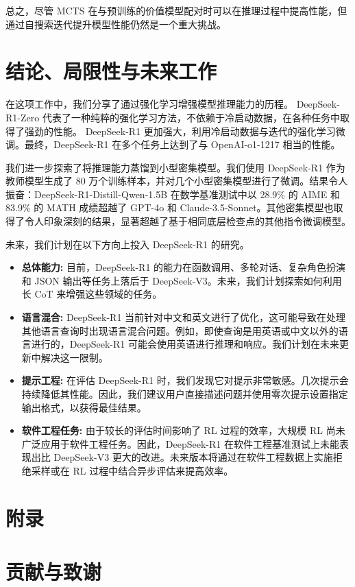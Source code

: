 \documentclass[11pt, a4paper, logo, copyright, nonumbering]{deepseek}
\newcommand{\dsri}{DeepSeek-R1}
\newcommand{\dsro}{DeepSeek-R1-Zero}
\begin{document}
总之，尽管 MCTS 在与预训练的价值模型配对时可以在推理过程中提高性能，但通过自搜索迭代提升模型性能仍然是一个重大挑战。
\section{结论、局限性与未来工作}

在这项工作中，我们分享了通过强化学习增强模型推理能力的历程。 \dsro{} 代表了一种纯粹的强化学习方法，不依赖于冷启动数据，在各种任务中取得了强劲的性能。 \dsri{} 更加强大，利用冷启动数据与迭代的强化学习微调。最终，\dsri{} 在多个任务上达到了与 OpenAI-o1-1217 相当的性能。

我们进一步探索了将推理能力蒸馏到小型密集模型。我们使用 \dsri{} 作为教师模型生成了 80 万个训练样本，并对几个小型密集模型进行了微调。结果令人振奋：DeepSeek-R1-Distill-Qwen-1.5B 在数学基准测试中以 28.9\% 的 AIME 和 83.9\% 的 MATH 成绩超越了 GPT-4o 和 Claude-3.5-Sonnet。其他密集模型也取得了令人印象深刻的结果，显著超越了基于相同底层检查点的其他指令微调模型。

未来，我们计划在以下方向上投入 \dsri{} 的研究。
\begin{itemize}[topsep=0pt]
    \item \textbf{总体能力:}
  目前，\dsri{} 的能力在函数调用、多轮对话、复杂角色扮演和 JSON 输出等任务上落后于 DeepSeek-V3。未来，我们计划探索如何利用长 CoT 来增强这些领域的任务。
    \item \textbf{语言混合:}
\dsri{} 当前针对中文和英文进行了优化，这可能导致在处理其他语言查询时出现语言混合问题。例如，即使查询是用英语或中文以外的语言进行的，\dsri{} 可能会使用英语进行推理和响应。我们计划在未来更新中解决这一限制。
 \item \textbf{提示工程:} 在评估 \dsri{} 时，我们发现它对提示非常敏感。几次提示会持续降低其性能。因此，我们建议用户直接描述问题并使用零次提示设置指定输出格式，以获得最佳结果。
\item  \textbf{软件工程任务:}
由于较长的评估时间影响了 RL 过程的效率，大规模 RL 尚未广泛应用于软件工程任务。因此，DeepSeek-R1 在软件工程基准测试上未能表现出比 DeepSeek-V3 更大的改进。未来版本将通过在软件工程数据上实施拒绝采样或在 RL 过程中结合异步评估来提高效率。

\end{itemize}



\newpage
\appendix
\section*{附录}
\section{贡献与致谢}
\end{document}
